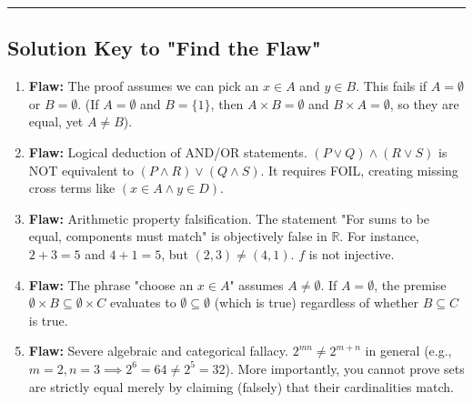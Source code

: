 \documentclass[12pt]{article}
\theoremstyle{definition}
\theoremstyle{remark}
\begin{document}
\vspace{0.5cm}
\hrule
\vspace{0.5cm}

\subsection*{Solution Key to "Find the Flaw"}
\begin{enumerate}
    \item \textbf{Flaw:} The proof assumes we can pick an $x \in A$ and $y \in B$. This fails if $A = \emptyset$ or $B = \emptyset$. (If $A = \emptyset$ and $B = \{1\}$, then $A \times B = \emptyset$ and $B \times A = \emptyset$, so they are equal, yet $A \neq B$).
    \item \textbf{Flaw:} Logical deduction of AND/OR statements. $(P \lor Q) \land (R \lor S)$ is NOT equivalent to $(P \land R) \lor (Q \land S)$. It requires FOIL, creating missing cross terms like $(x \in A \land y \in D)$.
    \item \textbf{Flaw:} Arithmetic property falsification. The statement "For sums to be equal, components must match" is objectively false in $\mathbb{R}$. For instance, $2 + 3 = 5$ and $4 + 1 = 5$, but $(2,3) \neq (4,1)$. $f$ is not injective.
    \item \textbf{Flaw:} The phrase "choose an $x \in A$" assumes $A \neq \emptyset$. If $A = \emptyset$, the premise $\emptyset \times B \subseteq \emptyset \times C$ evaluates to $\emptyset \subseteq \emptyset$ (which is true) regardless of whether $B \subseteq C$ is true. 
    \item \textbf{Flaw:} Severe algebraic and categorical fallacy. $2^{mn} \neq 2^{m+n}$ in general (e.g., $m=2, n=3 \implies 2^6 = 64 \neq 2^5 = 32$). More importantly, you cannot prove sets are strictly equal merely by claiming (falsely) that their cardinalities match.
\end{enumerate}
\end{document}
